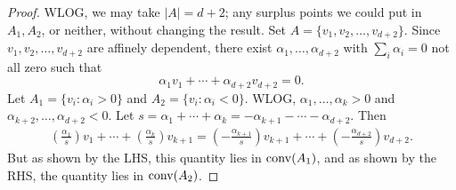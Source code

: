 \begin{proof}	
WLOG, we may take $|A|=d+2$; any surplus points we could put in $A_1,A_2$, or neither, without changing the result. Set $A=  \{v_1,v_2,\dotsc,v_{d+2}\}$. Since $v_1,v_2,\dotsc,v_{d+2}$ are affinely dependent, there exist $\alpha_1,\dotsc,\alpha_{d+2}$ with $\sum_i \alpha_i=0$ not all zero such that
\[
\alpha_1v_1 + \dotsb + \alpha_{d+2} v_{d+2} = 0.
\]
Let $A_1 = \{v_i : \alpha_i > 0\}$ and $A_2 = \{ v_i: \alpha_i < 0\}$. WLOG, $\alpha_1,\dotsc,\alpha_k > 0$ and $\alpha_{k+2},\dotsc,\alpha_{d+2} < 0$. Let $s = \alpha_1 + \dotsb + \alpha_k = - \alpha_{k+1} - \dotsb - \alpha_{d+2}$.
Then
\begin{align*}	
\left( \frac{\alpha_1}{s} \right) v_1 + \dotsb + \left( \frac{\alpha_k}{s} \right) v_{k+1} = \left( - \frac{\alpha_{k+1}}{s} \right)v_{k+1} + \dotsb + \left( - \frac{\alpha_{d+2}}{s} \right)v_{d+2}.
\end{align*}
But as shown by the LHS, this quantity lies in $\operatorname{conv}(A_1)$, and as shown by the RHS, the quantity lies in $\operatorname{conv}(A_2)$.
\end{proof}

